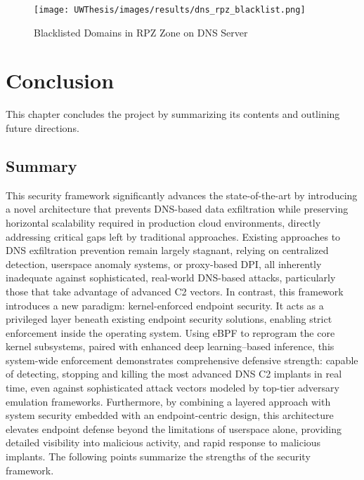 \documentclass [11pt, proquest] {uwthesis}[2020/02/24]
\begin{document}
\begin{figure}[H]
  \texttt{[image: UWThesis/images/results/dns\_rpz\_blacklist.png]}
  \caption{Blacklisted Domains in RPZ Zone on DNS Server}
  \label{fig:dns_rpz}
\end{figure}





    

\chapter{Conclusion}
This chapter concludes the project by summarizing its contents and outlining future directions.


\section{Summary}
This security framework significantly advances the state-of-the-art by introducing a novel architecture that prevents DNS-based data exfiltration while preserving horizontal scalability required in production cloud environments, directly addressing critical gaps left by traditional approaches. Existing approaches to DNS exfiltration prevention remain largely stagnant, relying on centralized detection, userspace anomaly systems, or proxy-based DPI, all inherently inadequate against sophisticated, real-world DNS-based attacks, particularly those that take advantage of advanced C2 vectors. In contrast, this framework introduces a new paradigm: kernel-enforced endpoint security. It acts as a privileged layer beneath existing endpoint security solutions, enabling strict enforcement inside the operating system. Using eBPF to reprogram the core kernel subsystems, paired with enhanced deep learning–based inference, this system-wide enforcement demonstrates comprehensive defensive strength: capable of detecting, stopping and killing the most advanced DNS C2 implants in real time, even against sophisticated attack vectors modeled by top-tier adversary emulation frameworks.
Furthermore, by combining a layered approach with system security embedded with an endpoint-centric design, this architecture elevates endpoint defense beyond the limitations of userspace alone, providing detailed visibility into malicious activity, and rapid response to malicious implants. The following points summarize the strengths of the security framework.
\end{document}
